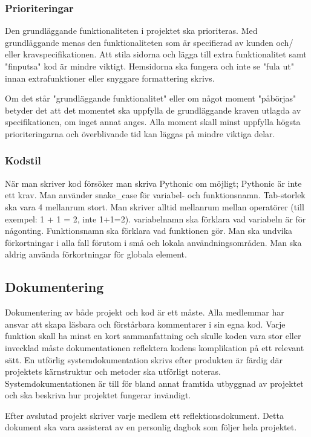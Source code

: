 \documentclass{liu_mall}
\begin{document}
        \subsubsection{Prioriteringar}
            Den grundläggande funktionaliteten i projektet ska prioriteras. Med grundläggande menas den funktionaliteten som är specifierad av kunden och/ eller kravspecifikationen. Att stila sidorna och lägga till extra funktionalitet samt "finputsa" kod är mindre viktigt. Hemsidorna ska fungera och inte se "fula ut" innan extrafunktioner eller snyggare formattering skrivs.

            Om det står "grundläggande funktionalitet" eller om något moment "påbörjas" betyder det att det momentet ska uppfylla de grundläggande kraven utlagda av specifikationen, om inget annat anges. Alla moment skall minst uppfylla högsta prioriteringarna och överblivande tid kan läggas på mindre viktiga delar.
        
        \subsubsection{Kodstil}
            När man skriver kod försöker man skriva Pythonic om möjligt; Pythonic är inte ett krav. Man använder snake\_case för variabel- och funktionsnamn. Tab-storlek ska vara 4 mellanrum stort. Man skriver alltid mellanrum mellan operatörer (till exempel: 1 + 1 = 2, inte 1+1=2). variabelnamn ska förklara vad variabeln är för någonting. Funktionsnamn ska förklara vad funktionen gör. Man ska undvika förkortningar i alla fall förutom i små och lokala användningsområden. Man ska aldrig använda förkortningar för globala element.

    \subsection{Dokumentering}
        Dokumentering av både projekt och kod är ett måste. Alla medlemmar har ansvar att skapa läsbara och förstårbara kommentarer i sin egna kod. Varje funktion skall ha minst en kort sammanfattning och skulle koden vara stor eller invecklad måste dokumentationen reflektera kodens komplikation på ett relevant sätt. En utförlig systemdokumentation skrivs efter produkten är färdig där projektets kärnstruktur och metoder ska utförligt noteras. Systemdokumentationen är till för bland annat framtida utbyggnad av projektet och ska beskriva hur projektet fungerar invändigt.

        Efter avslutad projekt skriver varje medlem ett reflektionsdokument. Detta dokument ska vara assisterat av en personlig dagbok som följer hela projektet.
\end{document}
